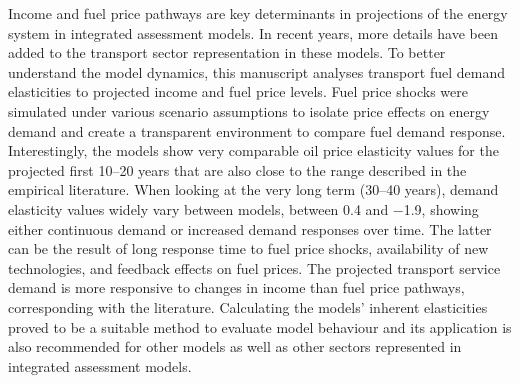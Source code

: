 Income and fuel price pathways are key determinants in projections of the energy system in integrated assessment models. In recent years, more details have been added to the transport sector representation in these models. To better understand the model dynamics, this manuscript analyses transport fuel demand elasticities to projected income and fuel price levels. Fuel price shocks were simulated under various scenario assumptions to isolate price effects on energy demand and create a transparent environment to compare fuel demand response. Interestingly, the models show very comparable oil price elasticity values for the projected first 10–20 years that are also close to the range described in the empirical literature. When looking at the very long term (30–40 years), demand elasticity values widely vary between models, between 0.4 and −1.9, showing either continuous demand or increased demand responses over time. The latter can be the result of long response time to fuel price shocks, availability of new technologies, and feedback effects on fuel prices. The projected transport service demand is more responsive to changes in income than fuel price pathways, corresponding with the literature. Calculating the models' inherent elasticities proved to be a suitable method to evaluate model behaviour and its application is also recommended for other models as well as other sectors represented in integrated assessment models.